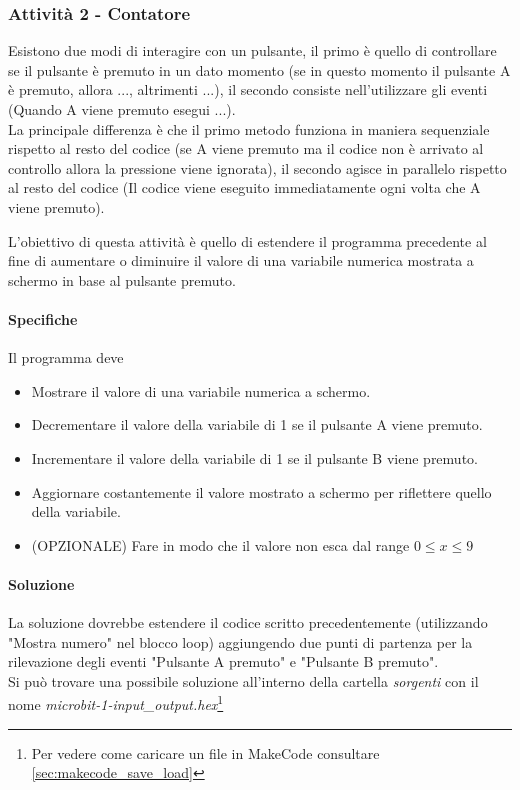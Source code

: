 \documentclass[../../docenti.tex]{subfiles}
\begin{document}
\subsubsection{Attività 2 - Contatore}
Esistono due modi di interagire con un pulsante, il primo è quello di controllare se il pulsante è premuto in un dato momento (se in questo momento il pulsante A è premuto, allora ..., altrimenti ...), il secondo consiste nell'utilizzare gli eventi (Quando A viene premuto esegui ...).\\
La principale differenza è che il primo metodo funziona in maniera sequenziale rispetto al resto del codice (se A viene premuto ma il codice non è arrivato al controllo allora la pressione viene ignorata), il secondo agisce in parallelo rispetto al resto del codice (Il codice viene eseguito immediatamente ogni volta che A viene premuto).

\vspace{1em}
L'obiettivo di questa attività è quello di estendere il programma precedente al fine di aumentare o diminuire il valore di una variabile numerica mostrata a schermo in base al pulsante premuto.

\paragraph{Specifiche}
Il programma deve
\begin{itemize}
	\item Mostrare il valore di una variabile numerica a schermo.
	\item Decrementare il valore della variabile di 1 se il pulsante A viene premuto.
	\item Incrementare il valore della variabile di 1 se il pulsante B viene premuto.
	\item Aggiornare costantemente il valore mostrato a schermo per riflettere quello della variabile.
	\item (OPZIONALE) Fare in modo che il valore non esca dal range \(0\leq x \leq 9\)
\end{itemize}

\paragraph{Soluzione}
La soluzione dovrebbe estendere il codice scritto precedentemente (utilizzando "Mostra numero" nel blocco loop) aggiungendo due punti di partenza per la rilevazione degli eventi "Pulsante A premuto" e "Pulsante B premuto".\\
Si può trovare una possibile soluzione all'interno della cartella \textit{sorgenti} con il nome \textit{microbit-1-input\_output.hex}\footnote{Per vedere come caricare un file in MakeCode consultare \autoref{sec:makecode_save_load}}
\end{document}
